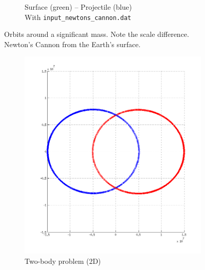\documentclass{article}
\begin{document}
\begin{figure}[H]
\begin{subfigure}[b]{0.3\textwidth}
                \caption{Surface (green) -- Projectile (blue)\\With \texttt{input\_newtons\_cannon.dat}}
                \label{fig:satgeo}
        \end{subfigure}
        \caption{Orbits around a significant mass. Note the scale difference.\\Newton's Cannon from the Earth's surface.}\label{fig:orbits}
\end{figure}

\begin{figure}[H]
        \centering
        \begin{subfigure}[b]{0.3\textwidth}
                \centering
                \includegraphics[width=\textwidth]{img/binary_xy}
                \caption{Two-body problem (2D)}
                \label{fig:earthsun}
        \end{subfigure}%
        ~ %
        \begin{subfigure}[b]{0.3\textwidth}
                \centering

\end{subfigure}
\end{figure}
\end{document}
